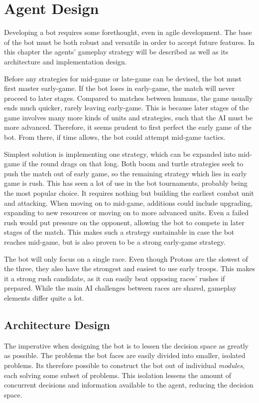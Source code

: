 \chapter{Agent Design}
Developing a bot requires some forethought, even in agile development. The base of the bot must be both robust and versatile in order to accept future features. In this chapter the agents' gameplay strategy will be described as well as its architecture and implementation design.

Before any strategies for mid-game or late-game can be devised, the bot must first master early-game. If the bot loses in early-game, the match will never proceed to later stages. Compared to matches between humans, the game usually ends much quicker, rarely leaving early-game. This is because later stages of the game involves many more kinds of units and strategies, such that the AI must be more advanced. Therefore, it seems prudent to first perfect the early game of the bot. From there, if time allows, the bot could attempt mid-game tactics.

Simplest solution is implementing one strategy, which can be expanded into mid-game if the round drags on that long. Both boom and turtle strategies seek to push the match out of early game, so the remaining strategy which lies in early game is rush. This has seen a lot of use in the bot tournaments, probably being the most popular choice. It requires nothing but building the earliest combat unit and attacking. When moving on to mid-game, additions could include upgrading, expanding to new resources or moving on to more advanced units. Even a failed rush would put pressure on the opponent, allowing the bot to compete in later stages of the match. This makes such a strategy sustainable in case the bot reaches mid-game, but is also proven to be a strong early-game strategy.

The bot will only focus on a single race. Even though Protoss are the slowest of the three, they also have the strongest and easiest to use early troops. This makes it a strong rush candidate, as it can easily beat opposing races' rushes if prepared. While the main AI challenges between races are shared, gameplay elements differ quite a lot.

\section{Architecture Design}
The imperative when designing the bot is to lessen the decision space as greatly as possible. The problems the bot faces are easily divided into smaller, isolated problems. Its therefore possible to construct the bot out of individual \emph{modules}, each solving some subset of problems. This isolation lessens the amount of concurrent decisions and information available to the agent, reducing the decision space.

